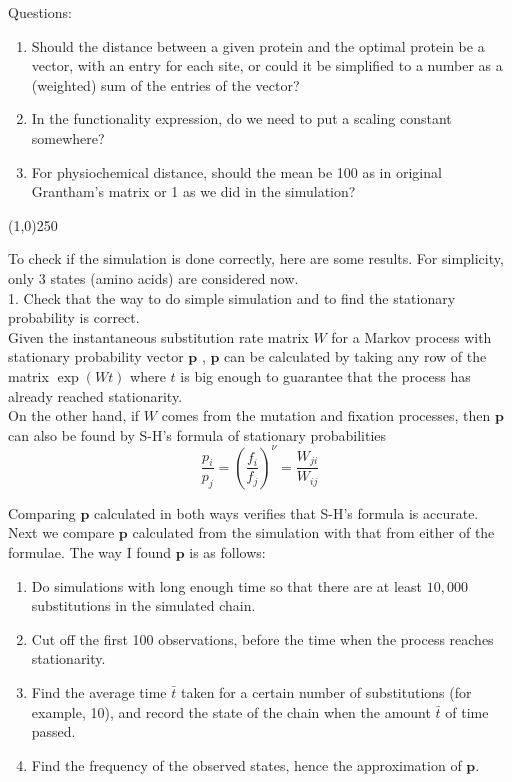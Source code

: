 \documentclass[13pt]{article}
\begin{document}
Questions:
\begin{enumerate}
\item Should the distance between a given protein and the optimal protein be a vector, with an entry for each site, or could it be simplified to a number as a (weighted) sum of the entries of the vector?
\item In the functionality expression, do we need to put a scaling constant somewhere?
\item For physiochemical distance, should the mean be 100 as in original Grantham's matrix or 1 as we did in the simulation?
\end{enumerate}

\begin{center}
\line(1,0){250}
\end{center}

To check if the simulation is done correctly, here are some results. For simplicity, only 3 states (amino acids) are considered now. \\

1. Check that the way to do simple simulation and to find the stationary probability is correct.\\

Given the instantaneous substitution rate matrix $W$ for a Markov process with stationary probability vector $\mathbf{p}$ , $\mathbf{p}$ can be calculated by taking any row of the matrix $\exp(Wt)$ where $t$ is big enough to guarantee that the process has already reached stationarity. \\

On the other hand, if $W$ comes from the mutation and fixation processes, then $\mathbf{p}$ can also be found by S-H's formula of stationary probabilities
\begin{equation}
\frac{p_i}{p_j} = (\frac{f_i}{f_j})^{\nu} = \frac{W_{ji}}{W_{ij}}
\label{eq:stationary}
\end{equation}




Comparing $\mathbf{p}$ calculated in both ways verifies that S-H's formula is accurate. Next we compare $\mathbf{p}$ calculated from the simulation with that from either of the formulae. The way I found $\mathbf{p}$ is as follows:\\
\begin{enumerate}
\item Do simulations with long enough time so that there are at least $10,000$ substitutions in the simulated chain.
\item Cut off the first 100 observations, before the time when the process reaches stationarity.
\item Find the average time $\bar{t}$ taken for a certain number of substitutions (for example, 10), and record the state of the chain when the amount $\bar{t}$ of time passed.
\item Find the frequency of the observed states, hence the approximation of $\mathbf{p}$.
\end{enumerate}
\end{document}
